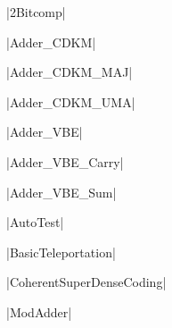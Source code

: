 \documentclass{article}
\begin{document}


|2Bitcomp|
\begin{figure}[ht]
\caption{\protect{}}

\end{figure}

|Adder_CDKM|
\begin{figure}[ht]
\caption{\protect{}}

\end{figure}

|Adder_CDKM_MAJ|
\begin{figure}[ht]
\caption{\protect{}}

\end{figure}

|Adder_CDKM_UMA|
\begin{figure}[ht]
\caption{\protect{}}

\end{figure}

|Adder_VBE|
\begin{figure}[ht]
\caption{\protect{}}

\end{figure}

|Adder_VBE_Carry|
\begin{figure}[ht]
\caption{\protect{}}

\end{figure}

|Adder_VBE_Sum|
\begin{figure}[ht]
\caption{\protect{}}

\end{figure}

|AutoTest|
\begin{figure}[ht]
\caption{\protect{}}

\end{figure}

|BasicTeleportation|
\begin{figure}[ht]
\caption{\protect{}}

\end{figure}
\clearpage

|CoherentSuperDenseCoding|
\begin{figure}[ht]
\caption{\protect{}}

\end{figure}

|ModAdder|
\begin{figure}[ht]
\caption{\protect{}}

\end{figure}
\end{document}
